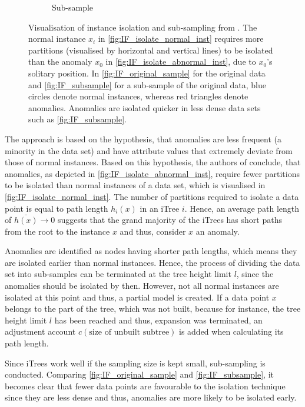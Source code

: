\begin{figure}
\begin{subfigure}[t]{0.23\textwidth}
        \caption{Sub-sample}
        \label{fig:IF_subsample}
    \end{subfigure}
    \caption{Visualisation of instance isolation and sub-sampling from \cite{liu2008isolation}. 
    The normal instance $x_i$ in \autoref{fig:IF_isolate_normal_inst} requires more partitions (visualised by horizontal and vertical lines) to be isolated than the anomaly $x_0$ in \autoref{fig:IF_isolate_abnormal_inst}, due to $x_0$'s solitary position.
    In \autoref{fig:IF_original_sample} for the original data and \autoref{fig:IF_subsample} for a sub-sample of the original data, blue circles denote normal instances, whereas red triangles denote anomalies. Anomalies are isolated quicker in less dense data sets such as \autoref{fig:IF_subsample}.}
\end{figure}
%
The approach is based on the hypothesis, that anomalies are less frequent (a minority in the data set) and have attribute values that extremely deviate from those of normal instances. 
Based on this hypothesis, the authors of \cite{liu2008isolation} conclude, that anomalies, as depicted in \autoref{fig:IF_isolate_abnormal_inst}, require fewer partitions to be isolated than normal instances of a data set, which is visualised in \autoref{fig:IF_isolate_normal_inst}. 
The number of partitions required to isolate a data point is equal to path length $h_i(x)$ in an \ac{iTree} $i$. 
Hence, an average path length of $\bar {h(x)} \to 0$ suggests that the grand majority of the \acp{iTree} has short paths from the root to the instance $x$ and thus, consider $x$ an anomaly.

Anomalies are identified as nodes having shorter path lengths, which means they are isolated earlier than normal instances. 
Hence, the process of dividing the data set into sub-samples can be terminated at the tree height limit $l$, since the anomalies should be isolated by then. 
However, not all normal instances are isolated at this point and thus, a partial model is created.
If a data point $x$ belongs to the part of the tree, which was not built, because for instance, the tree height limit $l$ has been reached and thus, expansion was terminated, an adjustment account $c(\text{size of unbuilt subtree})$ is added when calculating its path length.

Since \acp{iTree} work well if the sampling size is kept small, sub-sampling is conducted. Comparing \autoref{fig:IF_original_sample} and \autoref{fig:IF_subsample}, it becomes clear that fewer data points are favourable to the isolation technique since they are less dense and thus, anomalies are more likely to be isolated early.

